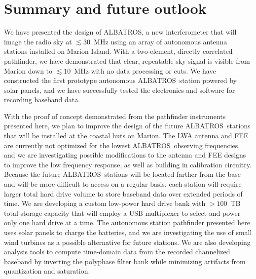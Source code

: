 \documentclass{ws-jai}
\def\albatros{ALBATROS}
\begin{document}

\section{Summary and future outlook}

We have presented the design of \albatros, a new interferometer that
will image the radio sky at $\lesssim30$~MHz using an array of
autonomous antenna stations installed on Marion Island.  With a
two-element, directly correlated pathfinder, we have demonstrated that
clear, repeatable sky signal is visible from Marion down to
$\lesssim10$~MHz with no data processing or cuts.  We have constructed
the first prototype autonomous \albatros\ station powered by solar
panels, and we have successfully tested the electronics and software
for recording baseband data.

With the proof of concept demonstrated from the pathfinder instruments
presented here, we plan to improve the design of the future
\albatros\ stations that will be installed at the coastal huts on
Marion.  The LWA antenna and FEE are currently not optimized for the
lowest \albatros\ observing frequencies, and we are investigating
possible modifications to the antenna and FEE designs to improve the
low frequency response, as well as building in calibration circuitry.
Because the future \albatros\ stations will be located farther from
the base and will be more difficult to access on a regular basis, each
station will require larger total hard drive volume to store baseband
data over extended periods of time.  We are developing a custom
low-power hard drive bank with $>100$~TB total storage capacity that
will employ a USB multiplexer to select and power only one hard drive
at a time.  The autonomous station pathfinder presented here uses
solar panels to charge the batteries, and we are investigating the use
of small wind turbines as a possible alternative for future stations.
We are also developing analysis tools to compute time-domain data from
the recorded channelized baseband by inverting the polyphase filter
bank while minimizing artifacts from quantization and saturation.
\end{document}
